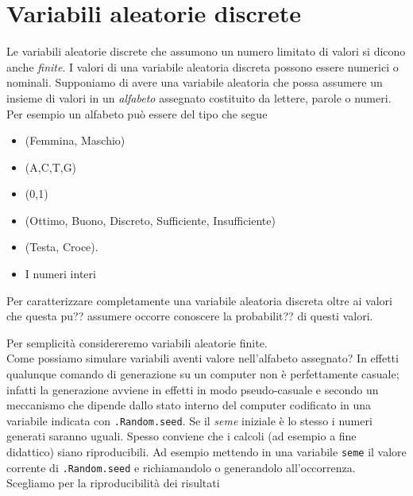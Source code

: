 \documentclass[onecolumn,11pt]{book}
\begin{document}
\section{Variabili aleatorie discrete}
Le variabili aleatorie  discrete che   assumono un numero limitato di valori si dicono anche \emph{finite}.  I valori di una variabile aleatoria discreta possono essere numerici o nominali. 
 Supponiamo di avere una variabile aleatoria che possa assumere un insieme di valori in  un \emph{alfabeto} assegnato costituito da lettere, parole o numeri. Per esempio un alfabeto pu\`o essere del tipo che segue
\begin{itemize}
\item{}(Femmina, Maschio)
\item{}(A,C,T,G)
\item{} (0,1) 
\item{}(Ottimo, Buono, Discreto, Sufficiente, Insufficiente)
\item{} (Testa, Croce). 
\item{} I numeri interi
\end{itemize}
Per caratterizzare completamente una variabile aleatoria discreta oltre ai valori che questa pu?? assumere occorre conoscere la probabilit?? di questi valori.












 Per semplicit\`a considereremo variabili aleatorie finite.\\
Come possiamo simulare variabili aventi valore nell'alfabeto assegnato?
In effetti qualunque comando di generazione su un computer non \`e perfettamente casuale; infatti
la generazione avviene in effetti in modo pseudo-casuale e  secondo un meccanismo che dipende dallo stato interno del computer codificato in una variabile indicata con \texttt{.Random.seed}. Se il {\it seme} iniziale \`e lo stesso i numeri generati saranno uguali. Spesso conviene che i calcoli (ad esempio a fine didattico) siano riproducibili. Ad esempio mettendo in una variabile \texttt{seme} il valore corrente di \texttt{.Random.seed} e richiamandolo o generandolo all'occorrenza. Scegliamo per la riproducibilit\`a dei risultati
\end{document}
